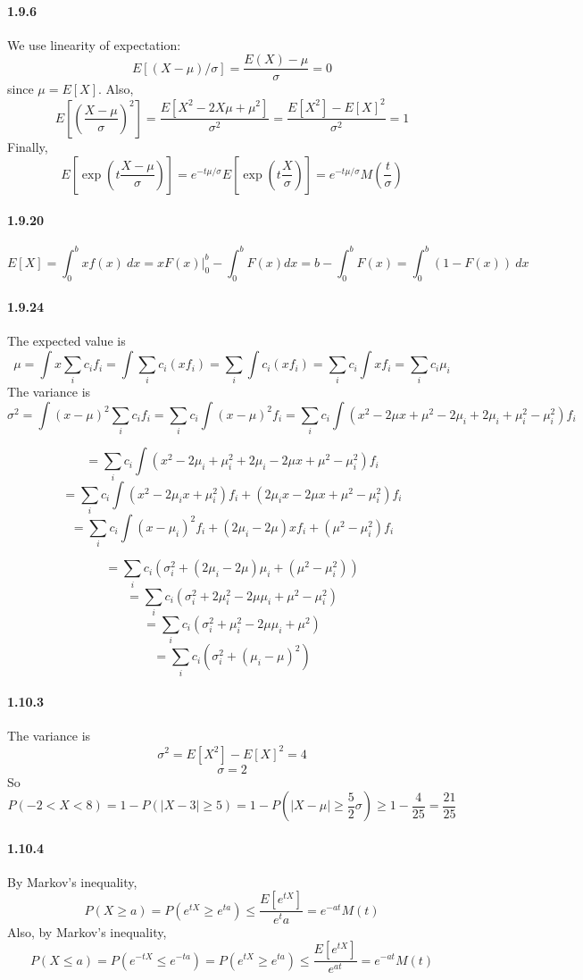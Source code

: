 \documentclass[10pt,letter]{article}
\begin{document}
\paragraph{1.9.6}
We use linearity of expectation:
\[ E[(X-\mu)/\sigma] = \frac{E(X) - \mu }{\sigma} = 0 \]
since $\mu = E[X]$. Also,
\[ E\left[\left(\frac{X-\mu}{\sigma}\right)^2\right] = \frac{E[X^2 - 2X\mu + \mu^2]}{\sigma^2} = \frac{E[X^2] - E[X]^2}{\sigma^2} = 1 \]
Finally,
\[ E\left[\exp\left(t\frac{X-\mu}{\sigma} \right)\right] = e^{-t\mu/\sigma}E\left[\exp\left(t\frac{X}{\sigma} \right)\right]  = e^{-t\mu/\sigma} M\left(\frac{t}{\sigma} \right)\]
\paragraph{1.9.20}
\[E[X] = \int_0^b x f(x) \ dx = xF(x) |_0^b - \int_0^b F(x) dx = b - \int_0^b F(x) = \int_0^b (1 - F(x)) \ dx \]
\paragraph{1.9.24}
The expected value is
\[ \mu = \int x \sum_i c_i f_i = \int \sum_i c_i (x f_i) = \sum_i \int c_i (x f_i) = \sum_i c_i \int xf_i = \sum_i c_i \mu_i \]
The variance is
\[ \sigma^2 = \int (x - \mu)^2 \sum_i c_i f_i = \sum_i c_i \int (x - \mu)^2 f_i = \sum_i c_i \int (x^2 - 2\mu x + \mu^2 - 2\mu_i + 2\mu_i + \mu_i^2 - \mu_i^2) f_i   \]

\[ = \sum_i c_i \int (x^2 - 2\mu_i + \mu_i^2 + 2\mu_i - 2\mu x + \mu^2  - \mu_i^2) f_i \]
\[ = \sum_i c_i \int (x^2 - 2\mu_i x + \mu_i^2)f_i + ( 2\mu_i x - 2\mu x + \mu^2  - \mu_i^2) f_i  \]
\[ = \sum_i c_i \int (x - \mu_i)^2 f_i + ( 2\mu_i  - 2\mu) x f_i + (\mu^2  - \mu_i^2) f_i  \]

\[ = \sum_i c_i \left( \sigma_i^2 + ( 2\mu_i  - 2\mu)\mu_i + (\mu^2  - \mu_i^2) \right) \]
\[ = \sum_i c_i \left( \sigma_i^2 + 2\mu_i^2  - 2\mu\mu_i + \mu^2  - \mu_i^2 \right) \]
\[ = \sum_i c_i \left( \sigma_i^2 + \mu_i^2  - 2\mu\mu_i + \mu^2   \right) \]
\[ = \sum_i c_i \left( \sigma_i^2 + (\mu_i - \mu)^2   \right) \]
\paragraph{1.10.3}
The variance is
\[ \sigma^2 = E[X^2] - E[X]^2 = 4 \]
\[ \sigma = 2 \]
So
\[ P(-2 < X < 8) = 1 - P(|X - 3| \ge 5) = 1 - P(|X-\mu| \ge \frac{5}{2}\sigma) \ge 1 - \frac{4}{25} = \frac{21}{25} \]
\paragraph{1.10.4}
By Markov's inequality,
\[ P(X \ge a) = P(e^{tX} \ge e^{ta}) \le \frac{E[e^{tX}]}{e^ta} = e^{-at} M(t) \]
Also, by Markov's inequality,
\[ P(X \le a) = P(e^{-tX} \le e^{-ta}) = P(e^{tX} \ge e^{ta}) \le \frac{E[e^{tX}]}{e^{at}} = e^{-at} M(t) \]
\end{document}
